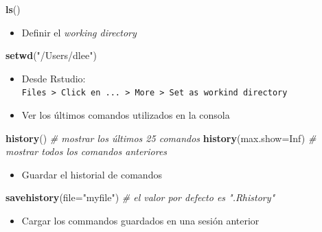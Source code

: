 \documentclass[]{book}
\newenvironment{Shaded}{\begin{snugshade}}{\end{snugshade}}
\newcommand{\KeywordTok}[1]{\textcolor[rgb]{0.13,0.29,0.53}{\textbf{#1}}}
\newcommand{\DataTypeTok}[1]{\textcolor[rgb]{0.13,0.29,0.53}{#1}}
\newcommand{\StringTok}[1]{\textcolor[rgb]{0.31,0.60,0.02}{#1}}
\newcommand{\CommentTok}[1]{\textcolor[rgb]{0.56,0.35,0.01}{\textit{#1}}}
\newcommand{\OtherTok}[1]{\textcolor[rgb]{0.56,0.35,0.01}{#1}}
\newcommand{\NormalTok}[1]{#1}
\providecommand{\tightlist}{%
  \setlength{\itemsep}{0pt}\setlength{\parskip}{0pt}}
\begin{document}
\begin{Shaded}
\begin{Highlighting}[]
\KeywordTok{ls}\NormalTok{()}
\end{Highlighting}
\end{Shaded}

\begin{itemize}
\tightlist
\item
  Definir el \emph{working directory}
\end{itemize}

\begin{Shaded}
\begin{Highlighting}[]
\KeywordTok{setwd}\NormalTok{(}\StringTok{"/Users/dlee"}\NormalTok{) }
\end{Highlighting}
\end{Shaded}

\begin{itemize}
\item
  Desde Rstudio:
  \texttt{Files\ \textgreater{}\ Click\ en\ ...\ \textgreater{}\ More\ \textgreater{}\ Set\ as\ workind\ directory}
\item
  Ver los últimos comandos utilizados en la consola
\end{itemize}

\begin{Shaded}
\begin{Highlighting}[]
\KeywordTok{history}\NormalTok{() }\CommentTok{# mostrar los últimos 25 comandos}
\KeywordTok{history}\NormalTok{(}\DataTypeTok{max.show=}\OtherTok{Inf}\NormalTok{) }\CommentTok{# mostrar todos los comandos anteriores}
\end{Highlighting}
\end{Shaded}

\begin{itemize}
\tightlist
\item
  Guardar el historial de comandos
\end{itemize}

\begin{Shaded}
\begin{Highlighting}[]
\KeywordTok{savehistory}\NormalTok{(}\DataTypeTok{file=}\StringTok{"myfile"}\NormalTok{) }\CommentTok{# el valor por defecto es ".Rhistory"}
\end{Highlighting}
\end{Shaded}

\begin{itemize}
\tightlist
\item
  Cargar los commandos guardados en una sesión anterior
\end{itemize}
\end{document}
